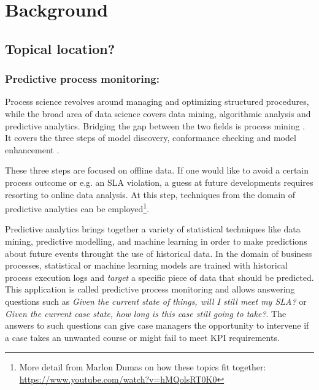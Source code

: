 \chapter{Background}\label{chap:background}
\section{Topical location?}
\subsection{Predictive process monitoring:}
Process science revolves around managing and optimizing structured procedures, while the broad area of data science covers data mining, algorithmic analysis and predictive analytics. 
Bridging the gap between the two fields is process mining \cite[p.18]{Aalst16}.
It covers the three steps of model discovery, conformance checking and model enhancement \cite{Aalst16}.

These three steps are focused on offline data.
If one would like to avoid a certain process outcome  or e.g. an SLA violation, a guess at future developments requires resorting to online data analysis.
At this step, techniques from the domain of predictive analytics can be employed\footnote{More detail from Marlon Dumas on how these topics fit together: \url{https://www.youtube.com/watch?v=hMQolsRT0K0}}.

Predictive analytics brings together a variety of statistical techniques like data mining, predictive modelling, and machine learning in order to make predictions about future events throught the use of historical data.
In the domain of business processes, statistical or machine learning models are trained with historical process execution logs and \textit{target} a specific piece of data that should be predicted.
This application is called predictive process monitoring and allows answering questions such as \textit{Given the current state of things, will I still meet my SLA?} or \textit{Given the current case state, how long is this case still going to take?}.
The answers to such questions can give case managers the opportunity to intervene if a case takes an unwanted course or might fail to meet KPI requirements.

